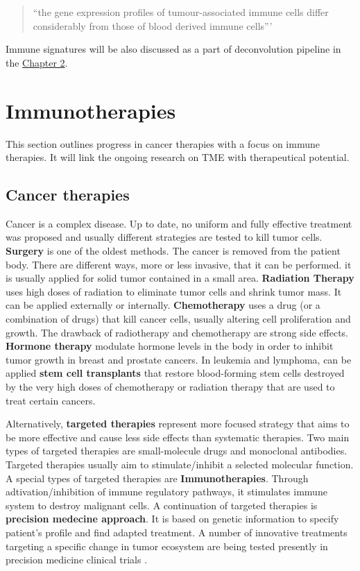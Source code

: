 \documentclass[12pt,]{book}
\theoremstyle{definition}
\theoremstyle{definition}
\theoremstyle{definition}
\theoremstyle{remark}
\begin{document}
\begin{quote}
``the gene expression profiles of tumour-associated immune cells differ
considerably from those of blood derived immune cells'''
\citep{Schelker2017}
\end{quote}

Immune signatures will be also discussed as a part of deconvolution
pipeline in the \protect\hyperlink{methods}{Chapter 2}.

\hypertarget{immunotherapies}{%
\section{Immunotherapies}\label{immunotherapies}}

This section outlines progress in cancer therapies with a focus on
immune therapies. It will link the ongoing research on TME with
therapeutical potential.

\hypertarget{cancer_Therapies}{%
\subsection{Cancer therapies}\label{cancer_Therapies}}

Cancer is a complex disease. Up to date, no uniform and fully effective
treatment was proposed and usually different strategies are tested to
kill tumor cells. \textbf{Surgery} is one of the oldest methods. The
cancer is removed from the patient body. There are different ways, more
or less invasive, that it can be performed. it is usually applied for
solid tumor contained in a small area. \textbf{Radiation Therapy} uses
high doses of radiation to eliminate tumor cells and shrink tumor mass.
It can be applied externally or internally. \textbf{Chemotherapy} uses a
drug (or a combination of drugs) that kill cancer cells, usually
altering cell proliferation and growth. The drawback of radiotherapy and
chemotherapy are strong side effects. \textbf{Hormone therapy } modulate
hormone levels in the body in order to inhibit tumor growth in breast
and prostate cancers. In leukemia and lymphoma, can be applied
\textbf{stem cell transplants} that restore blood-forming stem cells
destroyed by the very high doses of chemotherapy or radiation therapy
that are used to treat certain cancers.

Alternatively, \textbf{targeted therapies} represent more focused
strategy that aims to be more effective and cause less side effects than
systematic therapies. Two main types of targeted therapies are
small-molecule drugs and monoclonal antibodies. Targeted therapies
usually aim to stimulate/inhibit a selected molecular function. A
special types of targeted therapies are \textbf{Immunotherapies}.
Through adtivation/inhibition of immune regulatory pathways, it
stimulates immune system to destroy malignant cells. A continuation of
targeted therapies is \textbf{precision medecine approach}. It is based
on genetic information to specify patient's profile and find adapted
treatment. A number of innovative treatments targeting a specific change
in tumor ecosystem are being tested presently in precision medicine
clinical trials \citep{NCI2018}.
\end{document}
